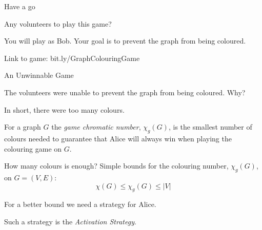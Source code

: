 \documentclass{beamer}
\begin{document}
\begin{frame}{\secname}{Have a go}
    
    
    Any volunteers to play this game?
    
    \bigskip
    
    You will play as Bob. Your goal is to prevent the graph from being coloured.
    
    
    \bigskip
    Link to game: bit.ly/GraphColouringGame
\end{frame}


\begin{frame}{\secname}{An Unwinnable Game}
    
    
    The volunteers were unable to prevent the graph from being coloured. Why?
    
    \bigskip
    
    In short, there were too many colours.
    
    
    \bigskip
    \pause
    
    \begin{definition}
        For a graph $G$ the \textit{game chromatic number}, $\chi_g(G)$, is the smallest number of colours needed to guarantee that Alice will always win when playing the colouring game on $G$.
    \end{definition}
   
\end{frame}

\begin{frame}{\secname}{How many colours is enough?}
    Simple bounds for the colouring number, $\chi_g(G)$, on $G=(V,E)$:
    \[\chi(G) \leq \chi_g(G) \leq |V|\]
    
    \bigskip
    
    For a better bound we need a strategy for Alice.
    
    \bigskip
    \pause
    
    Such a strategy is the \textit{Activation Strategy}.
\end{frame}


\end{document}
